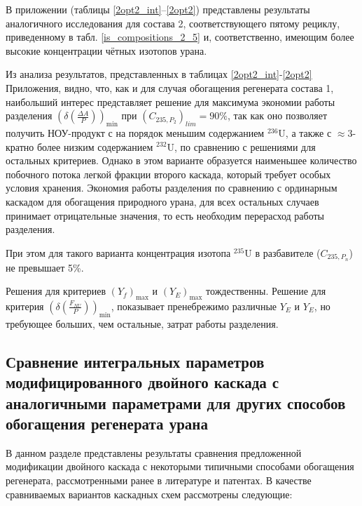 В приложении (таблицы \ref{2opt2_int}--\ref{2opt2}) представлены результаты аналогичного исследования для состава 2, соответствующего пятому рециклу, приведенному в табл. \ref{is_compositions_2_5} и, соответственно, имеющим более высокие концентрации чётных изотопов урана.


Из анализа результатов, представленных в таблицах \ref{2opt2_int}-\ref{2opt2} Приложения, видно, что, как и для случая обогащения регенерата состава 1, наибольший интерес представляет решение для максимума экономии работы разделения $(\delta(\frac{\Delta A}{P}))_\text{min}$ при $({C_{235,{P_2}}})_{lim}=90\%$, так как оно позволяет получить НОУ-продукт с на порядок меньшим содержанием $^{236}$U, а также с $\approx$3-кратно более низким содержанием $^{232}$U, по сравнению с решениями для остальных критериев. Однако в этом варианте образуется наименьшее количество побочного потока легкой фракции второго каскада, который требует особых условия хранения. 
Экономия работы разделения по сравнению с ординарным каскадом для обогащения природного урана, для всех остальных случаев принимает отрицательные значения, то есть необходим перерасход работы разделения.

При этом для такого варианта концентрация изотопа $^{235}$U в разбавителе ($C_{235,P_{n}}$) не превышает 5\%.

Решения для критериев $(Y_f)_\text{max}$ и $(Y_{E})_\text{max}$ тождественны. Решение для критерия $(\delta(\frac{F_{NU}}{P}))_\text{min}$, показывает пренебрежимо различные $Y_{E}$ и $Y_{E}$, но требующее больших, чем остальные, затрат работы разделения.

\subsection{Сравнение интегральных параметров модифицированного двойного каскада с аналогичными параметрами для других способов обогащения регенерата урана}\label{integral_comp}

В данном разделе представлены результаты сравнения предложенной модификации двойного каскада с некоторыми типичными способами обогащения регенерата, рассмотренными ранее в литературе и патентах. В качестве сравниваемых вариантов каскадных схем рассмотрены следующие: 


